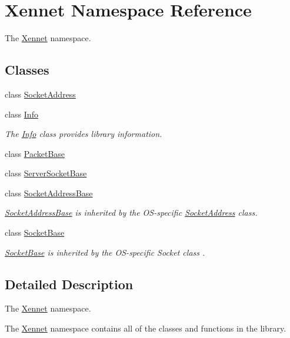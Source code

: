\hypertarget{namespaceXennet}{
\section{Xennet Namespace Reference}
\label{namespaceXennet}
}
The \hyperlink{namespaceXennet}{Xennet} namespace.  


\subsection*{Classes}
\begin{CompactItemize}
\item 
class \hyperlink{classXennet_1_1SocketAddress}{SocketAddress}
\item 
class \hyperlink{classXennet_1_1Info}{Info}
\begin{CompactList}\small\item\em The \hyperlink{classXennet_1_1Info}{Info} class provides library information. \item\end{CompactList}\item 
class \hyperlink{classXennet_1_1PacketBase}{PacketBase}
\item 
class \hyperlink{classXennet_1_1ServerSocketBase}{ServerSocketBase}
\item 
class \hyperlink{classXennet_1_1SocketAddressBase}{SocketAddressBase}
\begin{CompactList}\small\item\em \hyperlink{classXennet_1_1SocketAddressBase}{SocketAddressBase} is inherited by the OS-specific \hyperlink{classXennet_1_1SocketAddress}{SocketAddress} class. \item\end{CompactList}\item 
class \hyperlink{classXennet_1_1SocketBase}{SocketBase}
\begin{CompactList}\small\item\em \hyperlink{classXennet_1_1SocketBase}{SocketBase} is inherited by the OS-specific Socket class . \item\end{CompactList}\end{CompactItemize}


\subsection{Detailed Description}
The \hyperlink{namespaceXennet}{Xennet} namespace. 

The \hyperlink{namespaceXennet}{Xennet} namespace contains all of the classes and functions in the library. 
